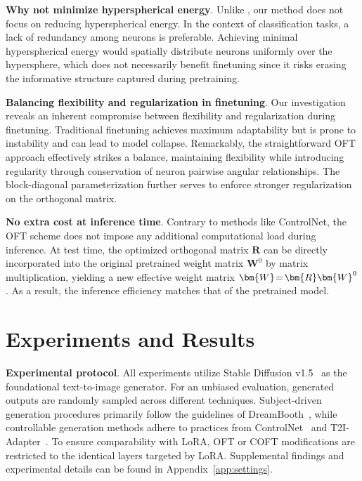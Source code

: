 {\textbf{Why not minimize hyperspherical energy}. Unlike \cite{liu2021orthogonal}, our method does not focus on reducing hyperspherical energy. In the context of classification tasks, a lack of redundancy among neurons is preferable. Achieving minimal hyperspherical energy would spatially distribute neurons uniformly over the hypersphere, which does not necessarily benefit finetuning since it risks erasing the informative structure captured during pretraining.

\textbf{Balancing flexibility and regularization in finetuning}. Our investigation reveals an inherent compromise between flexibility and regularization during finetuning. Traditional finetuning achieves maximum adaptability but is prone to instability and can lead to model collapse. Remarkably, the straightforward OFT approach effectively strikes a balance, maintaining flexibility while introducing regularity through conservation of neuron pairwise angular relationships. The block-diagonal parameterization further serves to enforce stronger regularization on the orthogonal matrix.

\textbf{No extra cost at inference time}. Contrary to methods like ControlNet, the OFT scheme does not impose any additional computational load during inference. At test time, the optimized orthogonal matrix $\bm{R}$ can be directly incorporated into the original pretrained weight matrix $\bm{W}^0$ by matrix multiplication, yielding a new effective weight matrix $\thickmuskip=2mu \medmuskip=2mu \bm{W}=\bm{R}\bm{W}^0$. As a result, the inference efficiency matches that of the pretrained model.

\section{Experiments and Results}

\textbf{Experimental protocol}. All experiments utilize Stable Diffusion v1.5~\cite{rombach2022high} as the foundational text-to-image generator. For an unbiased evaluation, generated outputs are randomly sampled across different techniques. Subject-driven generation procedures primarily follow the guidelines of DreamBooth~\cite{ruiz2023dreambooth}, while controllable generation methods adhere to practices from ControlNet~\cite{zhang2023adding} and T2I-Adapter~\cite{mou2023t2i}. To ensure comparability with LoRA, OFT or COFT modifications are restricted to the identical layers targeted by LoRA. Supplemental findings and experimental details can be found in Appendix~\ref{app:settings}.

}
